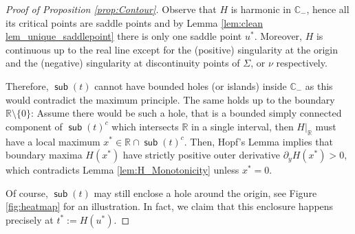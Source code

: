 \documentclass[reqno]{amsart}
\DeclareMathOperator{\sub}{\mathsf{sub}}
\newcommand{\1}{\mathbf{1}}
\newcommand{\C}{\mathbb{C}}
\newcommand{\R}{\mathbb{R}}
\def\R{\mathbb{R}}
\theoremstyle{plain}
\theoremstyle{definition}
\theoremstyle{remark}
\numberwithin{equation}{section}
\begin{document}
\begin{proof}[Proof of Proposition \ref{prop:Contour}]
	 Observe that $H$ is harmonic in $\C_-$, hence all its critical points are saddle points and by Lemma \ref{lem:clean lem_unique_saddlepoint} there is only one saddle point $u^*$. Moreover, $H$ is continuous up to the real line except for the (positive) singularity at the origin and the (negative) singularity at discontinuity points of $\Sigma$, or $\nu$ respectively. 
	
	
	Therefore, $\sub(t)$ cannot have bounded holes (or islands) inside $\C_-$ as this would contradict the maximum principle. The same holds up to the boundary $\R\setminus \{0\}$: Assume there would be such a hole, that is a bounded simply connected component of $\sub(t)^c$ which intersects $\R$ in a single interval, then $H|_\R$ must have a local maximum $x^*\in\R\cap \sub(t)^c$. Then, Hopf's Lemma \cite[\S 6.4]{Evans} implies that boundary maxima $H(x^*)$ have strictly positive outer derivative $\partial_y H(x^*)>0$, which contradicts Lemma \ref{lem:H_Monotonicity} unless $x^*=0$.  
	
	Of course, $\sub(t)$ may still enclose a hole around the origin, see Figure \ref{fig:heatmap} for an illustration. In fact, we claim that this enclosure happens precisely at $t^*:=H(u^*)$. 
	

\end{proof}
\end{document}
